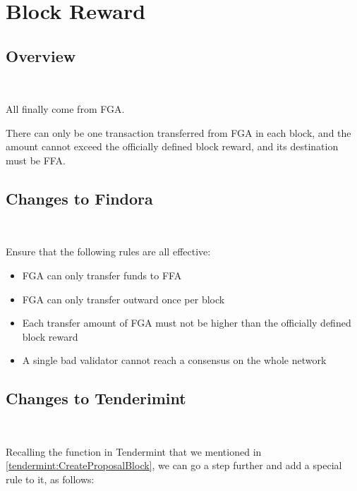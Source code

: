 \clearpage

\section{Block Reward} \label{section:reward}

\subsection{Overview}

~\par

All  finally come from FGA.

There can only be one transaction transferred from FGA in each block,
and the amount cannot exceed the officially defined block reward,
and its destination must be FFA.

\subsection{Changes to Findora}

~\par

Ensure that the following rules are all effective:

\begin{itemize}
    \item FGA can only transfer funds to FFA
    \item FGA can only transfer outward once per block
    \item Each transfer amount of FGA must not be higher than the officially defined block reward
    \item A single bad validator cannot reach a consensus on the whole network
\end{itemize}

\clearpage

\subsection{Changes to Tenderimint}

~\par

Recalling the  function in Tendermint that we mentioned in \ref{tendermint:CreateProposalBlock},
we can go a step further and add a special rule to it, as follows:

